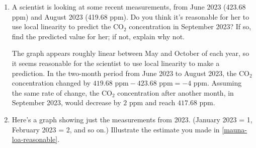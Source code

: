 \documentclass{article}
\begin{document}
\begin{enumerate}
  \begin{enumerate}
  \item \label{mauna-loa-reasonable}


    \begin{problem}[\vfill\newpage]
      A scientist is looking at some recent measurements, from June 2023 (423.68 ppm) and August 2023 (419.68 ppm). Do you think it's reasonable for her to use local linearity to predict the CO$_2$ concentration in September 2023? If so, find the predicted value for her; if not, explain why not.
    \end{problem}

    \begin{solution}
      The graph appears roughly linear between May and October of each year, so it seems reasonable for
      the scientist to use local linearity to make a prediction. 
      In the two-month period from June 2023 to August 2023, the CO$_2$
      concentration changed by $419.68\text{ ppm}-423.68\text{ ppm} = -4\text{ ppm}$. Assuming the same
      rate of change, the CO$_2$ concentration after another month, in September 2023, would decrease by 
      $2\text{ ppm}$ and reach $417.68\text{ ppm}$. 
    \end{solution}

  \item


    \begin{problem}
      Here's a graph showing just the measurements from 2023. (January 2023 = 1, February 2023 = 2, and so on.) Illustrate the estimate you made in \ref{mauna-loa-reasonable}.

    \end{problem}


\end{enumerate}
\end{enumerate}
\end{document}
